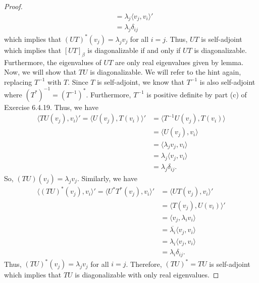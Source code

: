 \begin{proof}
\begin{align*}
                                                                                                  &= {\lambda}_{j} \langle {v}_{j} , {v}_{i} \rangle' \\
                                                                                                  &= {\lambda}_{j} {\delta}_{ij}
\end{align*}
which implies that \( (UT)^{*}({v}_{j}) = {\lambda}_{j} {v}_{j} \) for all \( i = j  \). Thus, \( UT  \) is self-adjoint which implies that \( [UT]_{\beta} \) is diagonalizable if and only if \( UT \) is diagonalizable. Furthermore, the eigenvalues of \( UT \) are only real eigenvalues given by lemma. Now, we will show that \( TU  \) is diagonalizable. We will refer to the hint again, replacing \( T^{-1} \) with \( T  \). Since \( T  \) is self-adjoint, we know that \( T^{-1} \) is also self-adjoint where \( (T^{*})^{-1} = (T^{-1})^{*}  \). Furthermore, \( T^{-1} \) is positive definite by part (c) of Exercise 6.4.19. Thus, we have
\begin{align*}
    \langle TU({v}_{j}) , {v}_{i}  \rangle' = \langle U({v}_{j}) , T({v}_{i}) \rangle' &= \langle T^{-1} U({v}_{j}) , T({v}_{i})  \rangle \\
                                                                                       &= \langle U({v}_{j}) , {v}_{i} \rangle \\
                                                                                       &= \langle {\lambda}_{j} {v}_{j} ,  {v}_{i} \rangle \\
                                                                                       &= {\lambda}_{j} \langle {v}_{j} ,  {v}_{i} \rangle \\ 
                                                                                       &= {\lambda}_{j} {\delta}_{ij}.
\end{align*}
So, \( (TU)({v}_{j}) = {\lambda}_{j} {v}_{j} \). Similarly, we have
\begin{align*}
    \langle (TU)^{*}({v}_{j}) , {v}_{i} \rangle'  = \langle U^{*}T^{*}({v}_{j}) , {v}_{i} \rangle' &= \langle UT({v}_{j}) , {v}_{i} \rangle' \\
                                                                                                   &= \langle T({v}_{j}) , U({v}_{i}) \rangle' \\
                                                                                                   &= \langle {v}_{j} ,  {\lambda}_{i} {v}_{i} \rangle \\ 
                                                                                                   &= \overline{{\lambda}_{i}} \langle {v}_{j}  ,  {v}_{i} \rangle \\
         &=  {\lambda}_{i} \langle {v}_{j} , {v}_{i} \rangle \\
         &= {\lambda}_{i} {\delta}_{ij}.
\end{align*}
Thus, \( (TU)^{*}({v}_{j}) = {\lambda}_{j} {v}_{j}  \) for all \( i = j  \). Therefore, \( (TU)^{*}  = TU  \) is self-adjoint which implies that \( TU \) is diagonalizable with only real eigenvalues. 


\end{proof}

